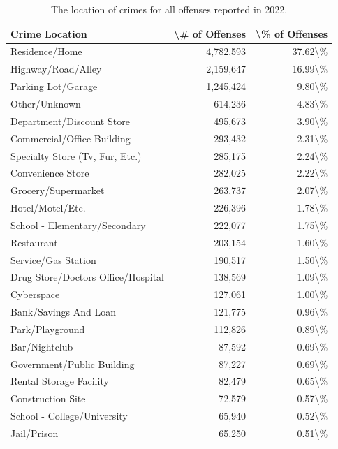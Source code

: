 \documentclass[
  12pt,
  openany]{book}
\begin{document}
\begin{longtable}[t]{lrr}
\caption{\label{tab:offenseLocation}The location of crimes for all offenses reported in 2022.}\\
\toprule
Crime Location & \textbackslash{}\# of Offenses & \textbackslash{}\% of Offenses\\
\midrule
Residence/Home & 4,782,593 & 37.62\textbackslash{}\%\\
Highway/Road/Alley & 2,159,647 & 16.99\textbackslash{}\%\\
Parking Lot/Garage & 1,245,424 & 9.80\textbackslash{}\%\\
Other/Unknown & 614,236 & 4.83\textbackslash{}\%\\
Department/Discount Store & 495,673 & 3.90\textbackslash{}\%\\
\addlinespace
Commercial/Office Building & 293,432 & 2.31\textbackslash{}\%\\
Specialty Store (Tv, Fur, Etc.) & 285,175 & 2.24\textbackslash{}\%\\
Convenience Store & 282,025 & 2.22\textbackslash{}\%\\
Grocery/Supermarket & 263,737 & 2.07\textbackslash{}\%\\
Hotel/Motel/Etc. & 226,396 & 1.78\textbackslash{}\%\\
\addlinespace
School - Elementary/Secondary & 222,077 & 1.75\textbackslash{}\%\\
Restaurant & 203,154 & 1.60\textbackslash{}\%\\
Service/Gas Station & 190,517 & 1.50\textbackslash{}\%\\
Drug Store/Doctors Office/Hospital & 138,569 & 1.09\textbackslash{}\%\\
Cyberspace & 127,061 & 1.00\textbackslash{}\%\\
\addlinespace
Bank/Savings And Loan & 121,775 & 0.96\textbackslash{}\%\\
Park/Playground & 112,826 & 0.89\textbackslash{}\%\\
Bar/Nightclub & 87,592 & 0.69\textbackslash{}\%\\
Government/Public Building & 87,227 & 0.69\textbackslash{}\%\\
Rental Storage Facility & 82,479 & 0.65\textbackslash{}\%\\
\addlinespace
Construction Site & 72,579 & 0.57\textbackslash{}\%\\
School - College/University & 65,940 & 0.52\textbackslash{}\%\\
Jail/Prison & 65,250 & 0.51\textbackslash{}\%\\

\end{longtable}
\end{document}
